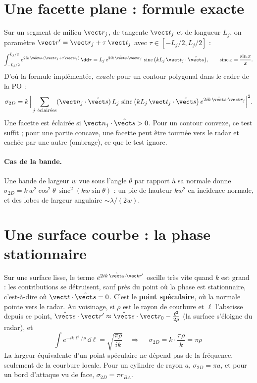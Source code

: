 \section{Une facette plane : formule exacte}
Sur un segment de milieu $\vect r_j$, de tangente $\vect t_j$ et de longueur $L_j$, on paramètre $\vect r'=\vect r_j+\tau\,\vect t_j$ avec $\tau\in[-L_j/2,L_j/2]$ :
\[
\int_{-L_j/2}^{L_j/2}e^{2ik\,\shat\cdot(\vect r_j+\tau\vect t_j)}\,\dd\tau
=L_j\,e^{2ik\,\shat\cdot\vect r_j}\,\operatorname{sinc}\big(kL_j\,\vect t_j\cdot\shat\big),\qquad\operatorname{sinc}x=\frac{\sin x}{x}.
\]
D'où la formule implémentée, \emph{exacte} pour un contour polygonal dans le cadre de la PO :
\[
\sigma_{2D}=k\,\Big|\sum_{j\ \text{éclairées}}(\vect n_j\cdot\shat)\,L_j\,\operatorname{sinc}\big(kL_j\,\vect t_j\cdot\shat\big)\,e^{2ik\,\shat\cdot\vect r_j}\Big|^2 .
\]
Une facette est éclairée si $\vect n_j\cdot\shat>0$. Pour un contour convexe, ce test suffit ; pour une partie concave, une facette peut être tournée vers le radar et cachée par une autre (ombrage), ce que le test ignore.

\paragraph{Cas de la bande.} Une bande de largeur $w$ vue sous l'angle $\theta$ par rapport à sa normale donne $\sigma_{2D}=k\,w^2\cos^2\theta\,\operatorname{sinc}^2(kw\sin\theta)$ : un pic de hauteur $kw^2$ en incidence normale, et des lobes de largeur angulaire $\sim\lambda/(2w)$.

\section{Une surface courbe : la phase stationnaire}
Sur une surface lisse, le terme $e^{2ik\,\shat\cdot\vect r'}$ oscille très vite quand $k$ est grand : les contributions se détruisent, sauf près du point où la phase est stationnaire, c'est-à-dire où $\vect t\cdot\shat=0$. C'est le \textbf{point spéculaire}, où la normale pointe vers le radar. Au voisinage, si $\rho$ est le rayon de courbure et $\ell$ l'abscisse depuis ce point, $\shat\cdot\vect r'\approx\shat\cdot\vect r_0-\frac{\ell^2}{2\rho}$ (la surface s'éloigne du radar), et
\[
\int e^{-ik\ell^2/\rho}\,\dd\ell=\sqrt{\frac{\pi\rho}{ik}}
\quad\Longrightarrow\quad
\boxed{\ \sigma_{2D}=k\cdot\frac{\pi\rho}{k}=\pi\rho\ }
\]
La largeur équivalente d'un point spéculaire ne dépend pas de la fréquence, seulement de la courbure locale. Pour un cylindre de rayon $a$, $\sigma_{2D}=\pi a$, et pour un bord d'attaque vu de face, $\sigma_{2D}=\pi r_{BA}$.

